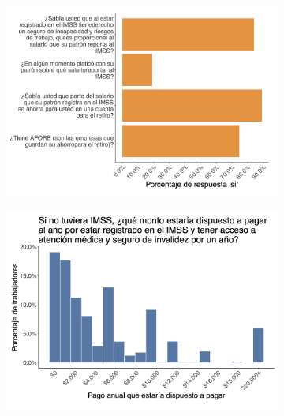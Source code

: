 \documentclass[oneside,11pt]{article}
\begin{document}
\begin{figure}[H]
    \caption{Worker Survey Graphs}
    \label{worker_surver_3}
    \begin{center}

    \begin{subfigure}{0.49\textwidth}
    \includegraphics[width=\textwidth]{04_Figures/workey_survey/Exp_13.png}
    \end{subfigure}
    \begin{subfigure}{0.49\textwidth}
    \includegraphics[width=\textwidth]{04_Figures/workey_survey/Exp_14.png}
    \end{subfigure}
    

\end{center}
\end{figure}
\end{document}
